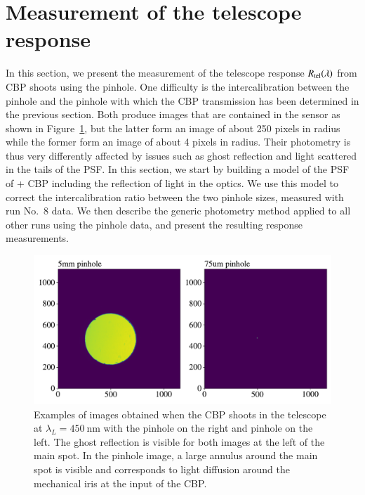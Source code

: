 \section{Measurement of the \SD telescope response}
\label{sec:rsd}
\label{sec:sd_datadesc}

In this section, we present the measurement of the \SD{} telescope response $R_{\mathrm{tel}}(\lambda)$ from CBP shoots using the \spinhole pinhole. One difficulty is the intercalibration between the \spinhole pinhole and the \bpinhole pinhole with which the CBP transmission has been determined in the previous section. Both produce images that are contained in the \SD sensor as shown in Figure~\ref{fig:ccd_examples}, but the latter form an image of about 250 pixels in radius while the former form an image of about 4 pixels in radius. Their photometry is thus very differently affected by issues such as ghost reflection and light scattered in the tails of the PSF. In this section, we start by building a model of the PSF of \SD+ CBP  including the reflection of light in the optics. We use this model to correct the intercalibration ratio between the two pinhole sizes, measured with run No.~8 data. We then describe the generic photometry method applied to all other runs using the \spinhole pinhole data, and present the resulting response measurements.   

\begin{figure}[h]
    \centering
    \includegraphics[width=\columnwidth]{fig/ccd_examples.pdf}
    \caption{Examples of images obtained when the CBP shoots in the \SD telescope at $\lambda_L=\SI{450}{\nm}$ with the \bpinhole pinhole on the right and \spinhole pinhole on the left. The ghost reflection is visible for both images at the left of the main spot. In the \bpinhole pinhole image, a large annulus around the main spot is visible and corresponds to light diffusion around the mechanical iris at the input of the CBP.}
    \label{fig:ccd_examples}
\end{figure}


